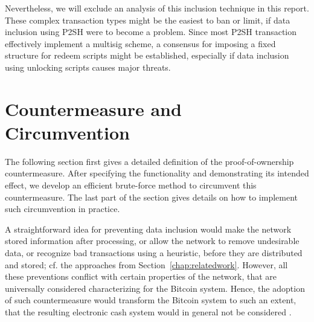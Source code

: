 \documentclass[a4paper,11pt,titlepage]{scrbook}
\begin{document}
Nevertheless, we will exclude an analysis of this inclusion technique in this report.
These complex transaction types might be the easiest to ban or limit, if data inclusion using P2SH were to become a problem.
Since most P2SH transaction effectively implement a multisig scheme, a consensus for imposing a fixed structure for redeem scripts might be established, especially if data inclusion using unlocking scripts causes major threats.



\chapter{Countermeasure and Circumvention}\label{chap:countermeasure}

The following section first gives a detailed definition of the proof-of-ownership countermeasure. After specifying the functionality and demonstrating its intended effect, we develop an efficient brute-force method to circumvent this countermeasure. The last part of the section gives details on how to implement such circumvention in practice.

A straightforward idea for preventing data inclusion would make the network  stored information after processing, or allow the network to remove undesirable data, or recognize bad transactions using a heuristic, before they are distributed and stored; cf. the approaches from Section~\ref{chap:relatedwork}.
However, all these preventions conflict with certain properties of the network, that are universally considered characterizing for the Bitcoin system.
Hence, the adoption of such countermeasure would transform the Bitcoin system to such an extent, that the resulting electronic cash system would in general not be considered .
\end{document}
